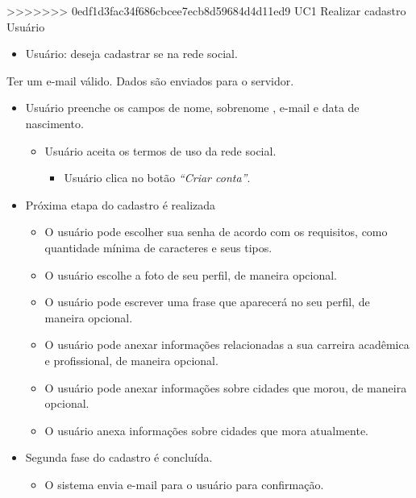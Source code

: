 \casoDeUso
>>>>>>> 0edf1d3fac34f686cbcee7ecb8d59684d4d11ed9
{UC1}
{Realizar cadastro}
{Usuário}
{
\begin{itemize}
	\item Usuário: deseja cadastrar se na rede social.	
\end{itemize}

}
{Ter um e-mail válido.}
{Dados são enviados para o servidor.}
{
\begin{itemize}
	\item Usuário preenche os campos de nome, sobrenome , e-mail e data de nascimento.
	\begin{itemize}
		\item Usuário aceita os termos de uso da rede social.	
		\begin{itemize}
			\item Usuário clica no botão \textit{“Criar conta”}.
		\end{itemize}
	\end{itemize}
	
	
	\item Próxima etapa do cadastro é realizada
	\begin{itemize}
		
		\item O usuário pode escolher sua senha de acordo com   os requisitos, como quantidade mínima de caracteres e seus tipos.
		\item O usuário escolhe a foto de seu perfil, de maneira opcional.
		\item O usuário pode escrever uma frase que aparecerá no seu perfil, de maneira opcional.
		
		\item O usuário pode anexar informações relacionadas a sua carreira acadêmica e profissional, de maneira opcional.
		
		\item O usuário pode anexar informações sobre cidades que morou, de maneira opcional.
		
		\item O usuário anexa informações sobre cidades que mora atualmente.
		
		
	\end{itemize}
\item Segunda fase do cadastro é concluída.
\begin{itemize}
			
			\item O sistema envia e-mail para o usuário para confirmação.
		\end{itemize}	
\end{itemize}
}
